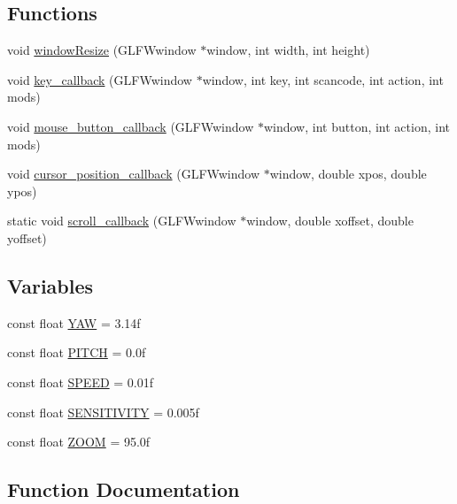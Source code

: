 \subsection*{Functions}
\begin{DoxyCompactItemize}
\item 
void \hyperlink{namespacespork_1_1graphics_ae56f76d7d8bd7ad755a954ca993878ce}{window\+Resize} (G\+L\+F\+Wwindow $\ast$window, int width, int height)
\item 
void \hyperlink{namespacespork_1_1graphics_ab17e028b0e60f8a7a1ab3c9902f07d13}{key\+\_\+callback} (G\+L\+F\+Wwindow $\ast$window, int key, int scancode, int action, int mods)
\item 
void \hyperlink{namespacespork_1_1graphics_a7ae98eeafa21bcd896da2ec50d75afff}{mouse\+\_\+button\+\_\+callback} (G\+L\+F\+Wwindow $\ast$window, int button, int action, int mods)
\item 
void \hyperlink{namespacespork_1_1graphics_a71429c5d3af7d02851e51444ccac3320}{cursor\+\_\+position\+\_\+callback} (G\+L\+F\+Wwindow $\ast$window, double xpos, double ypos)
\item 
static void \hyperlink{namespacespork_1_1graphics_a7c889944b857dd6bf9d2c4142f7d8854}{scroll\+\_\+callback} (G\+L\+F\+Wwindow $\ast$window, double xoffset, double yoffset)
\end{DoxyCompactItemize}
\subsection*{Variables}
\begin{DoxyCompactItemize}
\item 
const float \hyperlink{namespacespork_1_1graphics_a27253e30d118a61ead490405bdd6cfc8}{Y\+AW} = 3.\+14f
\item 
const float \hyperlink{namespacespork_1_1graphics_ac9787589d8e71045e39ed02bc8a0c0b2}{P\+I\+T\+CH} = 0.\+0f
\item 
const float \hyperlink{namespacespork_1_1graphics_a754adc661553dc3afc0adb4fd08863b6}{S\+P\+E\+ED} = 0.\+01f
\item 
const float \hyperlink{namespacespork_1_1graphics_a7d0352d4d49d3b84b3a7cfcdd3c17381}{S\+E\+N\+S\+I\+T\+I\+V\+I\+TY} = 0.\+005f
\item 
const float \hyperlink{namespacespork_1_1graphics_a31df36b1ae6649f4c8f2970b970f4bb3}{Z\+O\+OM} = 95.\+0f
\end{DoxyCompactItemize}


\subsection{Function Documentation}
\mbox{\label{namespacespork_1_1graphics_a71429c5d3af7d02851e51444ccac3320}} 

